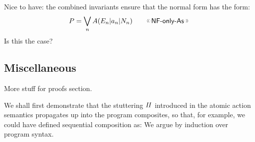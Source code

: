 Nice to have:
the combined invariants ensure that the normal form
has the form:
\[
  P = \bigvee_n A(E_n|a_n|N_n)  \qquad \elabel{NF-only-As}
\]
Is this the case?


\newpage
\subsection{Miscellaneous}

More stuff for proofs section.


We shall first demonstrate that the stuttering $\mathit{II}$
introduced in the atomic action semantics
propagates up into the program composites,
so that, for example, we could have defined sequential composition
as:
We argue by induction over program syntax.

